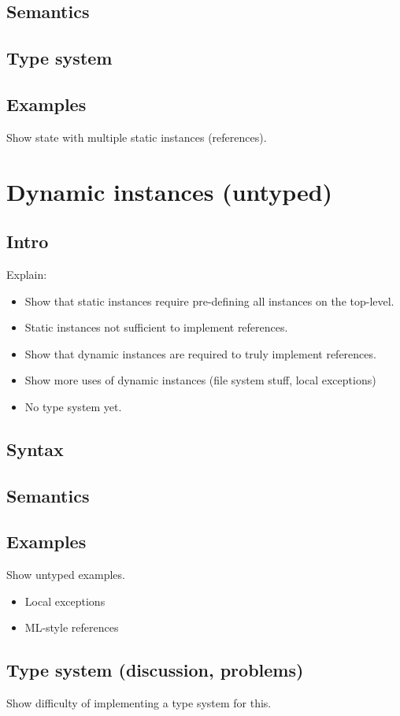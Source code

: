 {\subsection{Semantics}

\subsection{Type system}

\subsection{Examples}
Show state with multiple static instances (references).

\newpage
\section{Dynamic instances (untyped)}

\subsection{Intro}
Explain:
\begin{itemize}
	\item Show that static instances require pre-defining all instances on the top-level.
	\item Static instances not sufficient to implement references.
	\item Show that dynamic instances are required to truly implement references.
	\item Show more uses of dynamic instances (file system stuff, local exceptions)
	\item No type system yet.
\end{itemize}

\subsection{Syntax}

\subsection{Semantics}

\subsection{Examples}
Show untyped examples.
\begin{itemize}
	\item Local exceptions
	\item ML-style references
\end{itemize}

\subsection{Type system (discussion, problems)}
Show difficulty of implementing a type system for this.
}